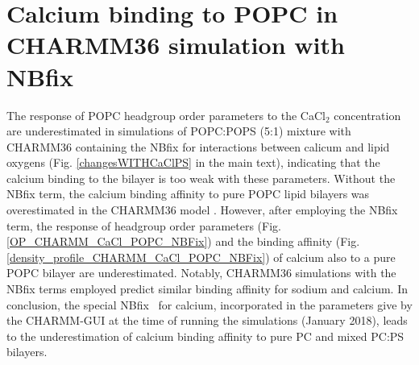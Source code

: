 \documentclass[journal=jpcbfk]{achemso}
\begin{document}
\newpage


%



\section{Calcium binding to POPC in CHARMM36 simulation with NBfix}\label{CHARMMcalciumNBfix}

The response of POPC headgroup order parameters to the CaCl$_2$ concentration
are underestimated in simulations of POPC:POPS (5:1) mixture with CHARMM36 containing
the NBfix for interactions between calicum and lipid oxygens \cite{kim16}
(Fig. \ref{changesWITHCaClPS} in the main text),
indicating that the calcium binding to the bilayer is too weak with these
parameters. Without the NBfix term, the calcium binding affinity to pure POPC
lipid bilayers was overestimated in the CHARMM36 model \cite{catte16}.
However, after employing the NBfix term, the response of headgroup order
parameters (Fig. \ref{OP_CHARMM_CaCl_POPC_NBFix}) and the binding affinity
(Fig. \ref{density_profile_CHARMM_CaCl_POPC_NBFix}) of calcium also to a pure
POPC bilayer are underestimated. Notably, CHARMM36 simulations with the NBfix
terms \cite{venable13,kim16} employed predict similar binding affinity for sodium and calcium.
In conclusion, the special NBfix~\cite{kim16} for calcium, 
incorporated in the parameters give by the CHARMM-GUI at the time
of running the simulations (January 2018), leads to the underestimation of
calcium binding affinity to pure PC and mixed PC:PS bilayers.
\end{document}
